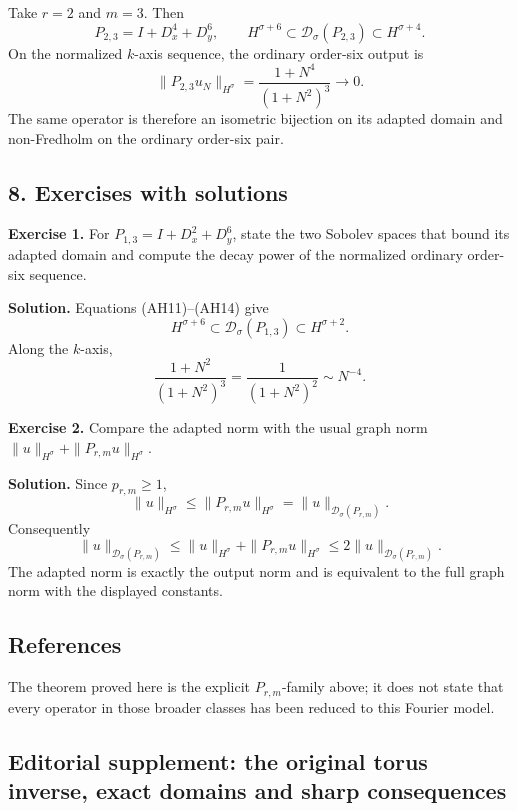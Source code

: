 \documentclass[
  11pt,
]{article}
\begin{document}
Take \(r=2\) and \(m=3\). Then \[
 P_{2,3}=I+D_x^4+D_y^6,\qquad
 H^{\sigma+6}\subset\mathcal D_\sigma(P_{2,3})
 \subset H^{\sigma+4}.
 \tag{AF1}
\] On the normalized \(k\)-axis sequence, the ordinary order-six output
is \[
 \|P_{2,3}u_N\|_{H^\sigma}
 =\frac{1+N^4}{(1+N^2)^3}
 \longrightarrow0 .
 \tag{AF2}
\] The same operator is therefore an isometric bijection on its adapted
domain and non-Fredholm on the ordinary order-six pair.

\subsection{8. Exercises with solutions}\label{exercises-with-solutions}

\textbf{Exercise 1.} For \(P_{1,3}=I+D_x^2+D_y^6\), state the two
Sobolev spaces that bound its adapted domain and compute the decay power
of the normalized ordinary order-six sequence.

\textbf{Solution.} Equations (AH11)--(AH14) give \[
 H^{\sigma+6}\subset\mathcal D_\sigma(P_{1,3})
 \subset H^{\sigma+2}.
\] Along the \(k\)-axis, \[
 \frac{1+N^2}{(1+N^2)^3}
 =\frac1{(1+N^2)^2}\sim N^{-4}.
\]

\textbf{Exercise 2.} Compare the adapted norm with the usual graph norm
\(\|u\|_{H^\sigma}+\|P_{r,m}u\|_{H^\sigma}\).

\textbf{Solution.} Since \(p_{r,m}\geq1\), \[
 \|u\|_{H^\sigma}
 \leq\|P_{r,m}u\|_{H^\sigma}
 =\|u\|_{\mathcal D_\sigma(P_{r,m})}.
\] Consequently \[
 \|u\|_{\mathcal D_\sigma(P_{r,m})}
 \leq\|u\|_{H^\sigma}+\|P_{r,m}u\|_{H^\sigma}
 \leq2\|u\|_{\mathcal D_\sigma(P_{r,m})}.
\] The adapted norm is exactly the output norm and is equivalent to the
full graph norm with the displayed constants.

\subsection{References}\label{references}

The theorem proved here is the explicit \(P_{r,m}\)-family above; it
does not state that every operator in those broader classes has been
reduced to this Fourier model.

\subsection{Editorial supplement: the original torus inverse, exact
domains and sharp consequences}\label{AN03-U043-COMPLETE}
\end{document}
